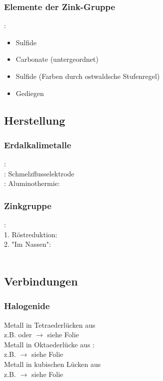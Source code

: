 \documentclass{article}
\begin{document}
\subsubsection{Elemente der Zink-Gruppe}
: \begin{itemize}
    \item Sulfide 
    \item Carbonate (untergeordnet)
\end{itemize}
 \begin{itemize}
    \item Sulfide  (Farben durch ostwaldsche Stufenregel)
    \item Gediegen
\end{itemize}

\subsection{Herstellung}
\subsubsection{Erdalkalimetalle}
: \\
: Schmelzflusselektrode\\
: Aluminothermie: 
\subsubsection{Zinkgruppe}
: \\
1. Röstreduktion: \\
2. "Im Nassen": \\\\

\subsection{Verbindungen}
\subsubsection{Halogenide }
Metall in Tetraederlücken aus \\
z.B.  oder  $\rightarrow$ siehe Folie\\
Metall in Oktaederlücke aus :\\
z.B.  $\rightarrow$ siehe Folie\\
Metall in kubischen Lücken aus \\
z.B.  $\rightarrow$ siehe Folie
\end{document}
